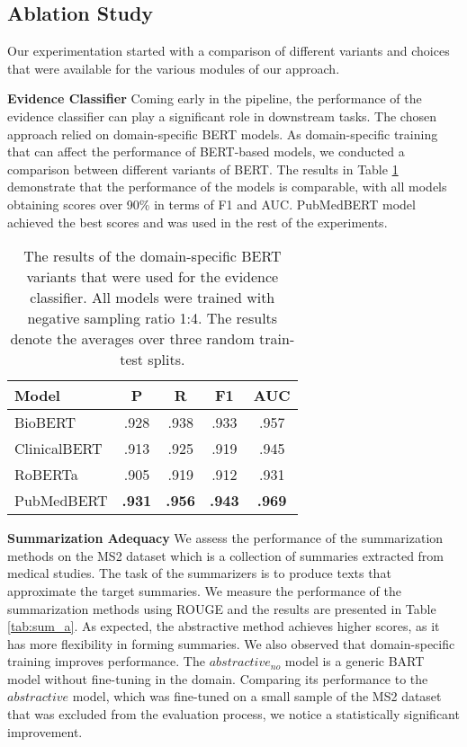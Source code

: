 \documentclass[11pt]{article}
\begin{document}
\subsection{Ablation Study}
Our experimentation started with a comparison of different variants and choices that were available for the various modules of our approach. 
  

\textbf{Evidence Classifier}
Coming early in the pipeline, the performance of the evidence classifier can play a significant role in downstream tasks. The chosen approach relied on domain-specific BERT models. As domain-specific training that can affect the performance of BERT-based models, we conducted a comparison between different variants of BERT. The results in Table \ref{tab:ev_s} demonstrate that the performance of the models is comparable, with all models obtaining scores over 90\% in terms of F1 and AUC. PubMedBERT model achieved the best scores and was used in the rest of the experiments.

\begin{table}[thp]
\centering
\begin{tabular}{lcccc}
\hline
\textbf{Model} & \textbf{P}& \textbf{R} & \textbf{F1} &\textbf{AUC}\\
\hline


BioBERT & .928& .938 & .933 & .957\\ 
ClinicalBERT  & .913& .925& .919 & .945\\ 
RoBERTa  & .905& .919& .912 & .931\\ 
PubMedBERT  & \textbf{.931}& \textbf{.956} & \textbf{.943} & \textbf{.969}\\ 

\hline

\hline
\end{tabular}

\caption{The results of the domain-specific BERT variants that were used for the evidence classifier. All models were trained with negative sampling ratio 1:4. The results denote the averages over three random train-test splits.}
\label{tab:ev_s}
\end{table}



\textbf{Summarization Adequacy}
\label{sec:summ}
We assess the performance of the summarization methods on the MS2 dataset which is a collection of summaries extracted from medical studies. The task of the summarizers is to produce texts that approximate the 
target summaries. 
We measure the performance of the summarization methods using ROUGE and the results are presented in Table \ref{tab:sum_a}. As expected, the abstractive method achieves higher scores, as it has more flexibility in forming summaries. We also observed that domain-specific training improves performance. The $abstractive_{no}$ model is a generic BART model without fine-tuning in the domain. Comparing its performance to the $abstractive$ model, which was fine-tuned on a small sample of the MS2 dataset that was excluded from the evaluation process, we notice a statistically significant improvement. 
\end{document}
